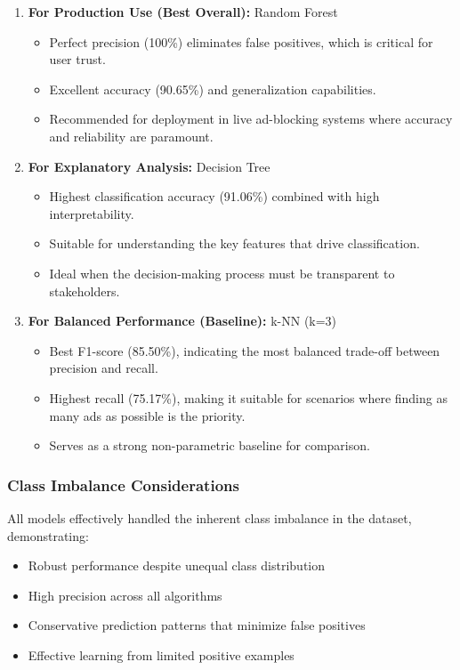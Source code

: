 \begin{enumerate}
    \item \textbf{For Production Use (Best Overall):} Random Forest
    \begin{itemize}
        \item Perfect precision (100\%) eliminates false positives, which is critical for user trust.
        \item Excellent accuracy (90.65\%) and generalization capabilities.
        \item Recommended for deployment in live ad-blocking systems where accuracy and reliability are paramount.
    \end{itemize}
    
    \item \textbf{For Explanatory Analysis:} Decision Tree
    \begin{itemize}
        \item Highest classification accuracy (91.06\%) combined with high interpretability.
        \item Suitable for understanding the key features that drive classification.
        \item Ideal when the decision-making process must be transparent to stakeholders.
    \end{itemize}
    
    \item \textbf{For Balanced Performance (Baseline):} k-NN (k=3)
    \begin{itemize}
        \item Best F1-score (85.50\%), indicating the most balanced trade-off between precision and recall.
        \item Highest recall (75.17\%), making it suitable for scenarios where finding as many ads as possible is the priority.
        \item Serves as a strong non-parametric baseline for comparison.
    \end{itemize}
\end{enumerate}

\subsubsection{Class Imbalance Considerations}

All models effectively handled the inherent class imbalance in the dataset, demonstrating:
\begin{itemize}
    \item Robust performance despite unequal class distribution
    \item High precision across all algorithms
    \item Conservative prediction patterns that minimize false positives
    \item Effective learning from limited positive examples
\end{itemize}

